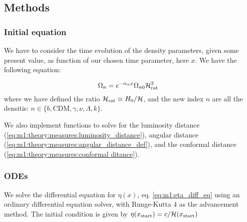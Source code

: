 \subsection{Methods}\label{sec:m1:methods}

\subsubsection{Initial equation}
    We have to consider the time evolution of the density parameters, given some present value, as function of our chosen time parameter, here $x$. We have the following equation:

    \begin{equation}\label{eq:m1:methods:initial:density_evolution}
        \Omega_n = e^{-\alpha_nx}\Omega_{n0}\mathcal{H}_\mathrm{rat}^2
    \end{equation}
    where we have defined the ratio $\mathcal{H}_\mathrm{rat} \equiv H_0/\mathcal{H}$, and the new index $n$ are all the densitis: $n\in\{b, \mathrm{CDM}, \gamma, \nu, \Lambda, k\}$.

    We also implement functions to solve for the luminosity distance (\cref{eq:m1:theory:measures:luminosity_distance}), angular distance (\cref{eq:m1:theory:measures:angular_distance_def}), and the conformal distance (\cref{eq:m1:theory:measures:conformal ditance}).



\subsubsection{ODEs}
    We solve the differential equation for $\eta(x)$, eq. \ref{eq:m1:eta_diff_eq} using an ordinary differential equation solver, with Runge-Kutta 4 as the advancement method. The initial condition is given by $\eta(x_\mathrm{start})=c/\mathcal{H}(x_\mathrm{start})$